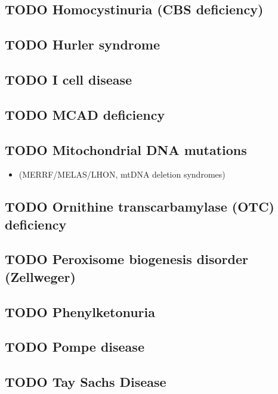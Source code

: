 \documentclass{scrartcl}
\begin{document}
\subsection{{\bfseries\sffamily TODO} Homocystinuria (CBS deficiency)}
\label{sec:org80217cd}
\subsection{{\bfseries\sffamily TODO} Hurler syndrome}
\label{sec:orga49efab}
\subsection{{\bfseries\sffamily TODO} I cell disease}
\label{sec:org5132d25}
\subsection{{\bfseries\sffamily TODO} MCAD deficiency}
\label{sec:org3816985}
\subsection{{\bfseries\sffamily TODO} Mitochondrial DNA mutations}
\label{sec:org3cde3ff}
\begin{itemize}
\item (MERRF/MELAS/LHON, mtDNA deletion syndromes)
\end{itemize}
\subsection{{\bfseries\sffamily TODO} Ornithine transcarbamylase (OTC) deficiency}
\label{sec:orgbc90b31}
\subsection{{\bfseries\sffamily TODO} Peroxisome biogenesis disorder (Zellweger)}
\label{sec:org24691ac}
\subsection{{\bfseries\sffamily TODO} Phenylketonuria}
\label{sec:org8a3307d}
\subsection{{\bfseries\sffamily TODO} Pompe disease}
\label{sec:orgc37bbec}
\subsection{{\bfseries\sffamily TODO} Tay Sachs Disease}
\label{sec:orgaaa8788}
\end{document}
